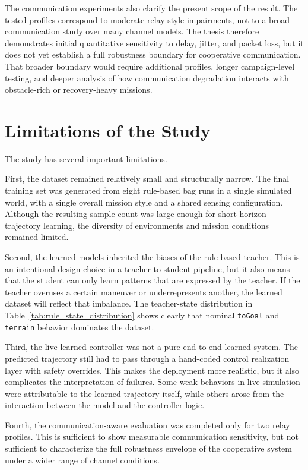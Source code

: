 The communication experiments also clarify the present scope of the result. The tested profiles correspond to moderate relay-style impairments, not to a broad communication study over many channel models. The thesis therefore demonstrates initial quantitative sensitivity to delay, jitter, and packet loss, but it does not yet establish a full robustness boundary for cooperative communication. That broader boundary would require additional profiles, longer campaign-level testing, and deeper analysis of how communication degradation interacts with obstacle-rich or recovery-heavy missions.

\section{Limitations of the Study}

The study has several important limitations.

First, the dataset remained relatively small and structurally narrow. The final training set was generated from eight rule-based bag runs in a single simulated world, with a single overall mission style and a shared sensing configuration. Although the resulting sample count was large enough for short-horizon trajectory learning, the diversity of environments and mission conditions remained limited.

Second, the learned models inherited the biases of the rule-based teacher. This is an intentional design choice in a teacher-to-student pipeline, but it also means that the student can only learn patterns that are expressed by the teacher. If the teacher overuses a certain maneuver or underrepresents another, the learned dataset will reflect that imbalance. The teacher-state distribution in Table~\ref{tab:rule_state_distribution} shows clearly that nominal \texttt{toGoal} and \texttt{terrain} behavior dominates the dataset.

Third, the live learned controller was not a pure end-to-end learned system. The predicted trajectory still had to pass through a hand-coded control realization layer with safety overrides. This makes the deployment more realistic, but it also complicates the interpretation of failures. Some weak behaviors in live simulation were attributable to the learned trajectory itself, while others arose from the interaction between the model and the controller logic.

Fourth, the communication-aware evaluation was completed only for two relay profiles. This is sufficient to show measurable communication sensitivity, but not sufficient to characterize the full robustness envelope of the cooperative system under a wider range of channel conditions.


